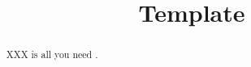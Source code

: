 \documentclass{article}
\title{Template}
\date{}
\begin{document}
\maketitle


\begin{abstract}
    XXX is all you need \citep{VaswaniSPUJGKP17, XAHC24}.
\end{abstract}






\clearpage
\printbibliography

\clearpage

\end{document}
